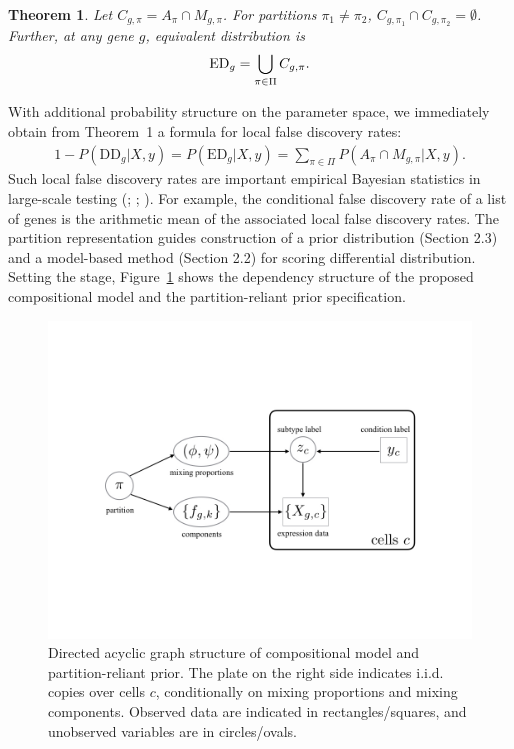 \documentclass[aoas,preprint]{imsart}
\newtheorem{theorem}{Theorem}
\begin{document}
\begin{theorem}  Let $C_{g,\pi} = A_\pi\cap M_{g, \pi}$.  For 
partitions $\pi_1 \neq\pi_2$, \mbox{$C_{g,\pi_1} \cap C_{g,\pi_2} = \emptyset$}. Further,
 at any gene $g$, equivalent distribution is
\begin{eqnarray*}
{\rm{ED}}_g = \bigcup_{\pi \in \Pi} C_{g,\pi}.
\end{eqnarray*}
\end{theorem}
With additional 
probability structure on the parameter space,  we immediately obtain from Theorem~1 
a formula for local false discovery rates:
\begin{align}
\label{eq:lfdr}
1-P(\text{DD}_g|X,y) = 
 P(\text{ED}_g|X,y) = \sum_{\pi \in \Pi} P\left(A_\pi \cap M_{g,\pi} |X,y \right).
\end{align}
Such local false discovery rates are important empirical Bayesian 
statistics in large-scale testing (\cite{Efron:2007aa}; \cite{Muralidharan:2010aa}; \cite{Newton:2004aa}).  
For example, the conditional false discovery rate of a list of genes 
is the arithmetic mean of the associated local false discovery rates.  
The partition representation guides construction of a prior distribution (Section 2.3) and a 
model-based method (Section 2.2) for scoring  differential distribution.   Setting the stage, 
Figure~\ref{fig:dag} shows the dependency structure of 
the proposed compositional model and the partition-reliant prior specification.

\begin{figure}[h!]
\includegraphics[trim={4cm 6cm 4cm 6cm}, clip, width=5in]{Figs/dag.png}
  \caption{Directed acyclic graph structure of compositional 
model and partition-reliant prior. The plate on the right side indicates i.i.d.
copies over cells $c$, conditionally on mixing proportions and mixing components.
 Observed data are indicated in rectangles/squares, and unobserved variables
are in circles/ovals. }
  \label{fig:dag}
\end{figure}
\end{document}
